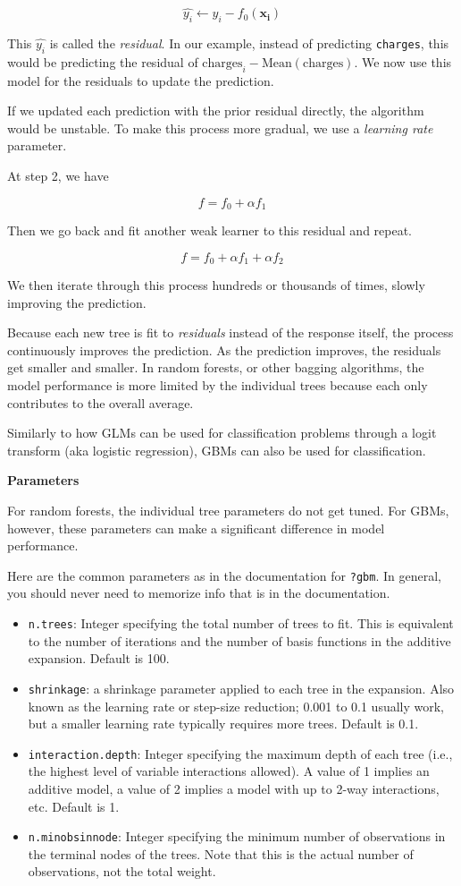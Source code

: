 \documentclass[]{book}
\begin{document}
\[ \hat{y_i} \leftarrow y_i - f_0(\mathbf{x_i})\]

This \(\hat{y_i}\) is called the \emph{residual}. In our example, instead of predicting \texttt{charges}, this would be predicting the residual of \(\text{charges}_i - \text{Mean}(\text{charges})\). We now use this model for the residuals to update the prediction.

If we updated each prediction with the prior residual directly, the algorithm would be unstable. To make this process more gradual, we use a \emph{learning rate} parameter.

At step 2, we have

\[f = f_0 + \alpha f_1\]

Then we go back and fit another weak learner to this residual and repeat.

\[f = f_0 + \alpha f_1 + \alpha f_2\]

We then iterate through this process hundreds or thousands of times, slowly improving the prediction.

Because each new tree is fit to \emph{residuals} instead of the response itself, the process continuously improves the prediction. As the prediction improves, the residuals get smaller and smaller. In random forests, or other bagging algorithms, the model performance is more limited by the individual trees because each only contributes to the overall average.

Similarly to how GLMs can be used for classification problems through a logit transform (aka logistic regression), GBMs can also be used for classification.

\textbf{Parameters}

For random forests, the individual tree parameters do not get tuned. For GBMs, however, these parameters can make a significant difference in model performance.

Here are the common parameters as in the documentation for \texttt{?gbm}. In general, you should never need to memorize info that is in the documentation.

\begin{itemize}
\item
  \texttt{n.trees}: Integer specifying the total number of trees to fit. This is equivalent to the number of iterations and the number of basis functions in the additive expansion. Default is 100.
\item
  \texttt{shrinkage}: a shrinkage parameter applied to each tree in the expansion. Also known as the learning rate or step-size reduction; 0.001 to 0.1 usually work, but a smaller learning rate typically requires more trees. Default is 0.1.
\item
  \texttt{interaction.depth}: Integer specifying the maximum depth of each tree (i.e., the highest level of variable interactions allowed). A value of 1 implies an additive model, a value of 2 implies a model with up to 2-way interactions, etc. Default is 1.
\item
  \texttt{n.minobsinnode}: Integer specifying the minimum number of observations in the terminal nodes of the trees. Note that this is the actual number of observations, not the total weight.
\end{itemize}
\end{document}
